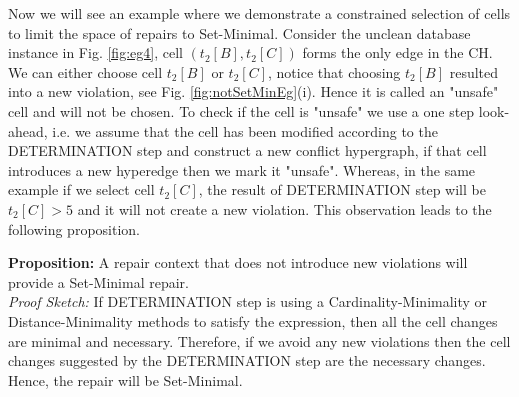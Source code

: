 Now we will see an example where we demonstrate a constrained selection of cells to limit the space of repairs to Set-Minimal.
Consider the unclean database instance in Fig. \ref{fig:eg4}, cell $(t_2[B], t_2[C])$ forms the only edge in the CH.
We can either choose cell $t_2[B]$ or $t_2[C]$, notice that choosing $t_2[B]$ resulted into a new violation, see Fig. \ref{fig:notSetMinEg}(i).
Hence it is called an "unsafe" cell and will not be chosen.
To check if the cell is "unsafe" we use a one step look-ahead, 
i.e. we assume that the cell has been modified according to the DETERMINATION step and construct a new conflict hypergraph, if that cell introduces a new hyperedge then we mark it "unsafe".
Whereas, in the same example if we select cell $t_2[C]$, the result of DETERMINATION step will be $t_2[C] > 5$ and it will not create a new violation.
This observation leads to the following proposition.

\textbf{Proposition:} A repair context that does not introduce new violations will provide a Set-Minimal repair. \\
\textit{Proof Sketch:} If DETERMINATION step is using a Cardinality-Minimality or Distance-Minimality methods to satisfy the expression, then all the cell changes are minimal and necessary.
Therefore, if we avoid any new violations then the cell changes suggested by the DETERMINATION step are the necessary changes.
Hence, the repair will be Set-Minimal.
